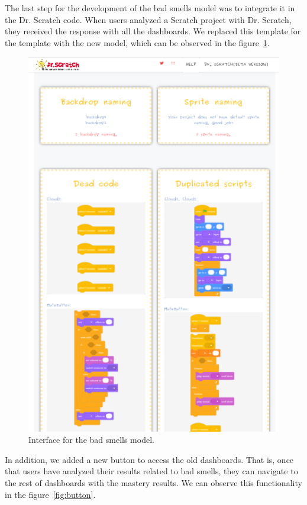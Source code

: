 The last step for the development of the bad smells model was to integrate it in the Dr. Scratch code. When users analyzed a Scratch project with Dr. Scratch, they received the response with all the dashboards. We replaced this template for the template with the new model, which can be observed in the figure~\ref{fig:newmodel}.

\begin{figure}
    \centering
    \includegraphics[width=12cm,                         keepaspectratio]{img/newmodel.png}
    \caption{Interface for the bad smells model.}
    \label{fig:newmodel}
\end{figure}

In addition, we added a new button to access the old dashboards. That is, once that users have analyzed their results related to bad smells, they can navigate to the rest of dashboards with the mastery results. We can observe this functionality in the figure~\ref{fig:button}.

